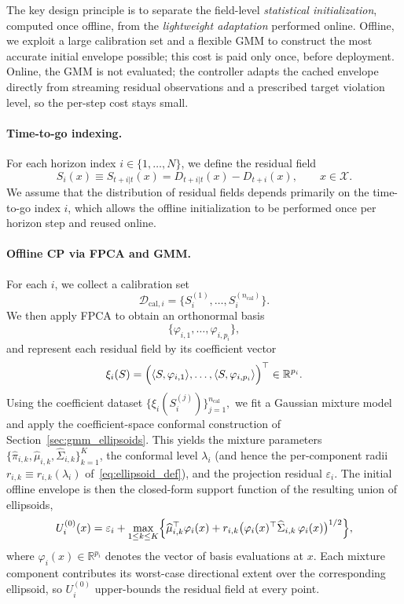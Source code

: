 \documentclass[lettersize,journal]{IEEEtran}
\begin{document}
The key design principle is to separate the field-level \emph{statistical initialization}, computed once offline, from the \emph{lightweight adaptation} performed online.
Offline, we exploit a large calibration set and a flexible GMM to construct the most accurate initial envelope possible; this cost is paid only once, before deployment.
Online, the GMM is not evaluated; the controller adapts the cached envelope directly from streaming residual observations and a prescribed target violation level, so the per-step cost stays small.

\paragraph{Time-to-go indexing.}
For each horizon index $i\in\{1,\dots,N\}$, we define the residual field
\begin{equation}
S_i(x)\equiv S_{t+i|t}(x)=D_{t+i|t}(x)-D_{t+i}(x),
\qquad x\in\mathcal X.
\label{eq:Si_def}
\end{equation}
We assume that the distribution of residual fields depends primarily on the time-to-go index $i$, which allows the offline initialization to be performed once per horizon step and reused online.

\paragraph{Offline CP via FPCA and GMM.}
For each $i$, we collect a calibration set
\[
\mathcal D_{\mathrm{cal},i}
=
\{S_i^{(1)},\dots,S_i^{(n_{\mathrm{cal}})}\}.
\]
We then apply FPCA to obtain an orthonormal basis
\[
\{\varphi_{i,1},\dots,\varphi_{i,p_i}\},
\]
and represent each residual field by its coefficient vector
\begin{equation}
\xi_i(S)
=
\Bigl(
\langle S,\varphi_{i,1}\rangle,\dots,\langle S,\varphi_{i,p_i}\rangle
\Bigr)^\top
\in\mathbb R^{p_i}.
\label{eq:coeff_def_mpc}
\end{equation}
Using the coefficient dataset
$
\{\xi_i(S_i^{(j)})\}_{j=1}^{n_{\mathrm{cal}}},
$
we fit a Gaussian mixture model and apply the coefficient-space conformal construction of Section~\ref{sec:gmm_ellipsoids}.
This yields the mixture parameters $\{\widehat\pi_{i,k},\widehat\mu_{i,k},\widehat\Sigma_{i,k}\}_{k=1}^K$, the conformal level $\lambda_i$ (and hence the per-component radii $r_{i,k}\equiv r_{i,k}(\lambda_i)$ of~\eqref{eq:ellipsoid_def}), and the projection residual $\varepsilon_i$.
The initial offline envelope is then the closed-form support function of the resulting union of ellipsoids,
\begin{equation}
U_i^{(0)}(x)
=
\varepsilon_i+\max_{1\le k\le K}\Bigl\{\widehat\mu_{i,k}^\top\varphi_i(x)+r_{i,k}\bigl(\varphi_i(x)^\top\widehat\Sigma_{i,k}\,\varphi_i(x)\bigr)^{1/2}\Bigr\},
\label{eq:Ui_init}
\end{equation}
where $\varphi_i(x)\in\mathbb R^{p_i}$ denotes the vector of basis evaluations at $x$.
Each mixture component contributes its worst-case directional extent over the corresponding ellipsoid, so $U_i^{(0)}$ upper-bounds the residual field at every point.
\end{document}
